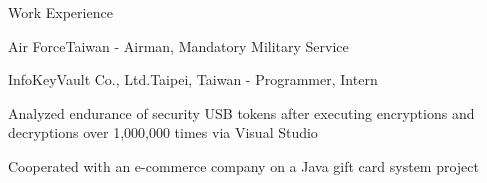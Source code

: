 \documentclass{cv}
\begin{document}
\begin{cvSection}{Work Experience}
\begin{experienceSubsection}{Air Force}{Taiwan}{ - }{Airman, Mandatory Military Service}
\end{experienceSubsection}

\begin{experienceSubsection}{InfoKeyVault Co., Ltd.}{Taipei, Taiwan}{ - }{Programmer, Intern}

\item Analyzed endurance of security USB tokens after executing encryptions and decryptions over 1,000,000 times via Visual Studio
\item Cooperated with an e-commerce company on a Java gift card system project

\end{experienceSubsection}

\end{cvSection}


\end{document}
